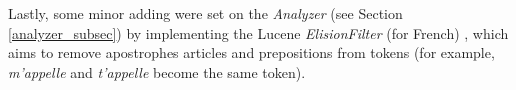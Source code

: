 \newline
Lastly, some minor adding were set on the \textit{Analyzer} (see Section \ref{analyzer_subsec}) by implementing the Lucene \textit{ElisionFilter} (for French) \cite{luceneelisionfilter}, which aims to remove apostrophes articles and prepositions from tokens (for example, \textit{m'appelle} and \textit{t'appelle} become the same token).




